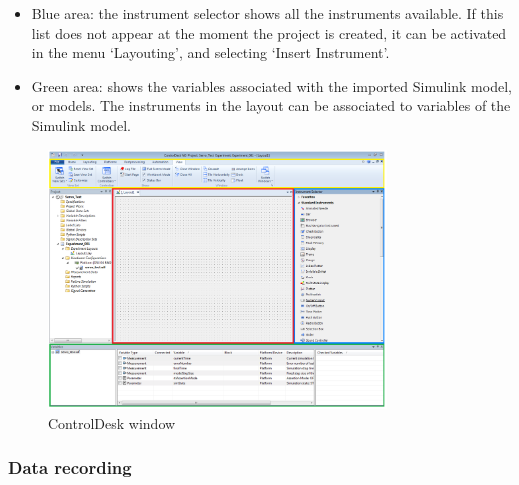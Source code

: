 \begin{enumerate}
\begin{itemize}
        \item Blue area: the instrument selector shows all the instruments available. If this list does not appear at the moment the project is created, it can be activated in the menu ‘Layouting’, and selecting ‘Insert Instrument’.
        \item Green area: shows the variables associated with the imported Simulink model, or models. The instruments in the layout can be associated to variables of the Simulink model.
    \end{itemize}
    \begin{figure}[H]
        \centering
        \includegraphics[width=0.8\textwidth]{Images/Ball and Bean/ControlDesk/CD6.png}
        \caption{ControlDesk window}
        \label{fig29}
    \end{figure}
    
\end{enumerate}


\subsubsection{Data recording}

